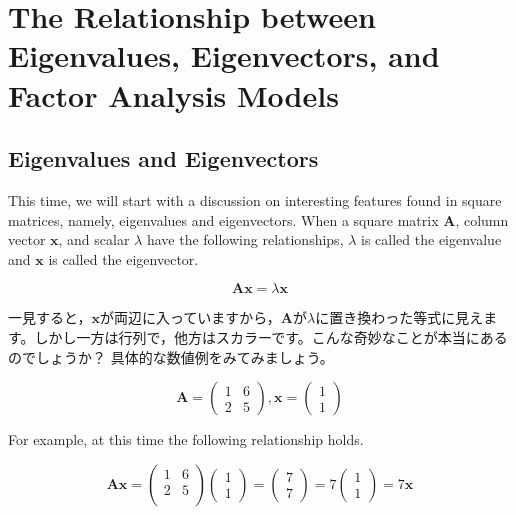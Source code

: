 \documentclass{ltjsbook}
\begin{document}
\chapter{The Relationship between Eigenvalues, Eigenvectors, and Factor Analysis Models}
\label{x08_eigen}

\section{Eigenvalues and Eigenvectors}
This time, we will start with a discussion on interesting features found in square matrices, namely, eigenvalues and eigenvectors.
When a square matrix $\bm{A}$, column vector $\bm{x}$, and scalar $\lambda$ have the following relationships, $\lambda$ is called the eigenvalue and $\bm{x}$ is called the eigenvector.

\[ \bm{Ax} = \lambda\bm{x} \]

一見すると，$\bm{x}$が両辺に入っていますから，$\bm{A}$が$\lambda$に置き換わった等式に見えます。しかし一方は行列で，他方はスカラーです。こんな奇妙なことが本当にあるのでしょうか？
具体的な数値例をみてみましょう。

\[
	\bm{A} = \begin{pmatrix}
		1 & 6 \\ 2 & 5
	\end{pmatrix}
	,\bm{x} = \begin{pmatrix}
		1 \\ 1
	\end{pmatrix}
\]

For example, at this time the following relationship holds.

\[
	\bm{Ax} =
	\begin {pmatrix}
	1 & 6 \\
	2 & 5 \\
	\end{pmatrix}
	\begin{pmatrix}
		1 \\ 1
	\end{pmatrix}
	=
	\begin{pmatrix}
		7 \\ 7
	\end{pmatrix}
	=7
	\begin{pmatrix}
		1 \\ 1
	\end{pmatrix}
	=7 \bm{x}
\]
\end{document}
